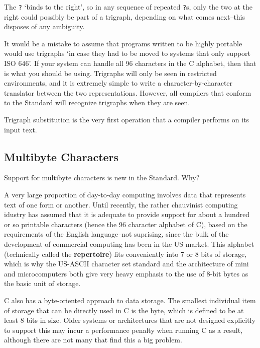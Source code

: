    The \texttt{?} `binds to the right', so in any sequence of
    repeated \texttt{?}s, only the two at the right could possibly be part
    of a trigraph, depending on what comes next--this disposes of any
    ambiguity.


   It would be a mistake to assume that programs written to be highly
    portable would use trigraphs `in case they had to be moved to systems
    that only support ISO 646'. If your system can handle all 96
    characters in the C alphabet, then that is what you should be using.
    Trigraphs will only be seen in restricted environments, and it is
    extremely simple to write a character-by-character translator between the
    two representations. However, all compilers that conform to the Standard
    will recognize trigraphs when they are seen.


   Trigraph substitution is the very first operation that a compiler
    performs on its input text.


  

  \subsection{Multibyte Characters}
   

   Support for multibyte characters is new in the Standard. Why?


   A very large proportion of day-to-day computing involves data that
    represents text of one form or another. Until recently, the rather
    chauvinist computing idustry has assumed that it is adequate to provide
    support for about a hundred or so printable characters (hence the
    96 character alphabet of C), based on the requirements of the
    English language--not suprising, since the bulk of the development
    of commercial computing has been in the US market. This alphabet
    (technically called the \textbf{repertoire}) fits conveniently into 7 or
    8 bits of storage, which is why the US-ASCII character set standard
    and the architecture of mini and microcomputers both give very heavy
    emphasis to the use of 8-bit bytes as the basic unit of storage.


   C also has a byte-oriented approach to data storage. The smallest
    individual item of storage that can be directly used in C is the byte,
    which is defined to be at least 8 bits in size. Older systems or
    architectures that are not designed explicitly to support this may incur a
    performance penalty when running C as a result, although there are not
    many that find this a big problem.



